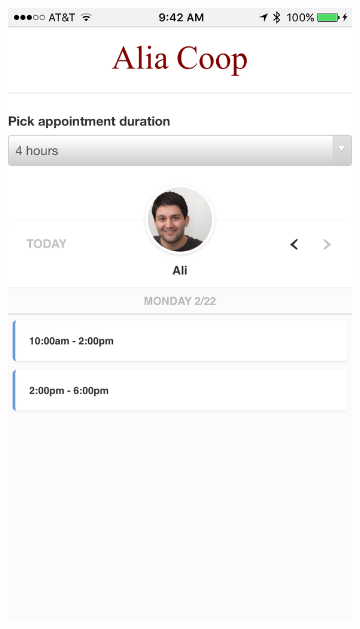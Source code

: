 \documentclass[11pt]{article}
\begin{document}
\begin{figure}
\centering
    \begin{subfigure}[b]{0.3\textwidth}
        \includegraphics[width=\textwidth]{figures/1.png}
        \label{fig:sched}
    \end{subfigure}
    ~ %
    \begin{subfigure}[b]{0.3\textwidth}

\end{subfigure}
\end{figure}
\end{document}
